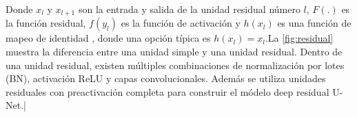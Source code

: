 	Donde $x_l$ y $x_{l+1}$ son la entrada y salida de la unidad residual número $l$, $F(.)$ es la función residual, $f(y_l)$ es la función de activación y $h(x_l)$ es una función de mapeo de identidad , donde una opción típica es $h(x_l)=x_l$.La \ref{fig:residual} muestra la diferencia entre una unidad simple y una unidad residual. Dentro de una unidad residual, existen múltiples combinaciones de normalización por lotes (BN), activación ReLU y capas convolucionales. Además se utiliza unidades residuales con preactivación completa para construir el módelo deep residual U-Net.|
	
